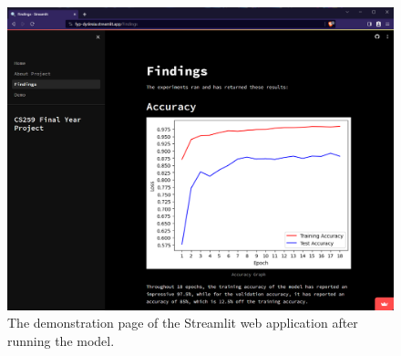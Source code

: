 \begin{figure}[h]
    \centering
    \includegraphics[scale=0.3]{./appendices/images/findings.png}
    \caption{The demonstration page of the Streamlit web application after running the model.}
    \label{fig:home}
\end{figure}
